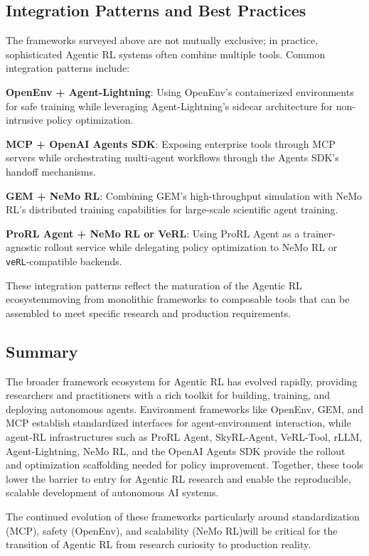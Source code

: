 \subsection{Integration Patterns and Best Practices}

The frameworks surveyed above are not mutually exclusive; in practice, sophisticated Agentic RL systems often combine multiple tools. Common integration patterns include:

\textbf{OpenEnv + Agent-Lightning}: Using OpenEnv's containerized environments for safe training while leveraging Agent-Lightning's sidecar architecture for non-intrusive policy optimization.

\textbf{MCP + OpenAI Agents SDK}: Exposing enterprise tools through MCP servers while orchestrating multi-agent workflows through the Agents SDK's handoff mechanisms.

\textbf{GEM + NeMo RL}: Combining GEM's high-throughput simulation with NeMo RL's distributed training capabilities for large-scale scientific agent training.

\textbf{ProRL Agent + NeMo RL or VeRL}: Using ProRL Agent as a trainer-agnostic rollout service while delegating policy optimization to NeMo RL or \texttt{veRL}-compatible backends.

These integration patterns reflect the maturation of the Agentic RL ecosystemmoving from monolithic frameworks to composable tools that can be assembled to meet specific research and production requirements.

\subsection{Summary}

The broader framework ecosystem for Agentic RL has evolved rapidly, providing researchers and practitioners with a rich toolkit for building, training, and deploying autonomous agents. Environment frameworks like OpenEnv, GEM, and MCP establish standardized interfaces for agent-environment interaction, while agent-RL infrastructures such as ProRL Agent, SkyRL-Agent, VeRL-Tool, rLLM, Agent-Lightning, NeMo RL, and the OpenAI Agents SDK provide the rollout and optimization scaffolding needed for policy improvement. Together, these tools lower the barrier to entry for Agentic RL research and enable the reproducible, scalable development of autonomous AI systems.

The continued evolution of these frameworks particularly around standardization (MCP), safety (OpenEnv), and scalability (NeMo RL)will be critical for the transition of Agentic RL from research curiosity to production reality.

